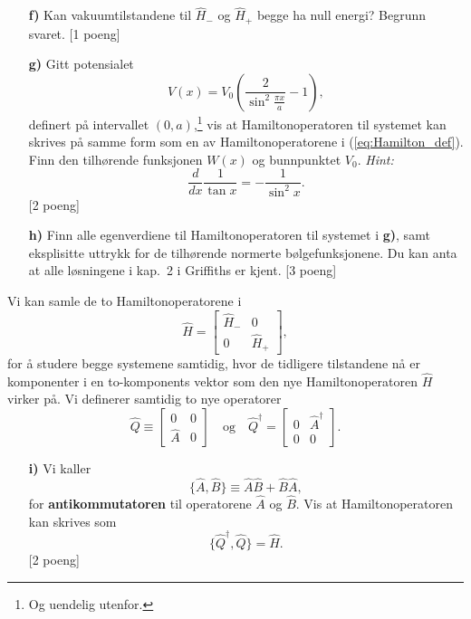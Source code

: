 \documentclass[11pt,a4paper]{report}
\newcounter{excount}[chapter]
\newenvironment{exercise}[1][]{\addtocounter{excount}{1} \noindent {\bf Oppgave
    \arabic{excount} \ \ #1}\hspace{2mm}}{\vspace{4mm}}
\begin{document}
\begin{exercise}{\bf En super symmetri\\}
\begin{itemize}
\item[{\bf f)}] Kan vakuumtilstandene til $\hat H_-$ og $\hat H_+$ begge ha null energi? Begrunn svaret. [1 poeng]

\item[{\bf g)}] Gitt potensialet 
\begin{equation}
V(x)=V_0\left(\frac{2}{\sin^2\frac{\pi x}{a}}-1\right),
\end{equation}
definert på intervallet $(0,a)$,\footnote{Og uendelig utenfor.} vis at Hamiltonoperatoren til systemet kan skrives på samme form som en av Hamiltonoperatorene i  (\ref{eq:Hamilton_def}). Finn den tilhørende funksjonen $W(x)$ og bunnpunktet $V_0$. {\it Hint:} 
\begin{equation}
\frac{d}{dx}\frac{1}{\tan x}=-\frac{1}{\sin^2x}.
\end{equation} [2 poeng]

\item[{\bf h)}]
Finn alle egenverdiene til Hamiltonoperatoren til systemet i {\bf g)}, samt eksplisitte uttrykk for de tilhørende normerte bølgefunksjonene. Du kan anta at alle løsningene i kap.\ 2 i Griffiths er kjent. 
[3 poeng]
\end{itemize}

Vi kan samle de to Hamiltonoperatorene i
\begin{equation}
    \hat H = \left[\begin{matrix} \hat H_- & 0 \\ 0 & \hat H_+ \end{matrix}\right],
\end{equation}
for å studere begge systemene samtidig, hvor de tidligere tilstandene nå er komponenter i en to-komponents vektor som den nye Hamiltonoperatoren $\hat H$ virker på. Vi definerer samtidig to nye operatorer 
\begin{equation}
    \hat Q \equiv \left[\begin{matrix} 0 & 0 \\ \hat A&0 \end{matrix}\right]
    \quad \text{og} \quad
    \hat Q^\dagger= \left[ \begin{matrix} 0 & \hat A^\dagger \\ 0 & 0 \end{matrix} \right].
\end{equation}

\begin{itemize}
\item[{\bf i)}] Vi kaller
\begin{equation}
\{\hat A,\hat B\}\equiv\hat A\hat B+\hat B\hat A,
\end{equation}
for {\bf antikommutatoren} til operatorene $\hat A$ og $\hat B$. Vis at Hamiltonoperatoren kan skrives som 
\begin{equation}
\{\hat Q^\dagger,\hat Q\}=\hat H.\label{eq:Qantikom}
\end{equation}
[2 poeng]


\end{itemize}
\end{exercise}
\end{document}
